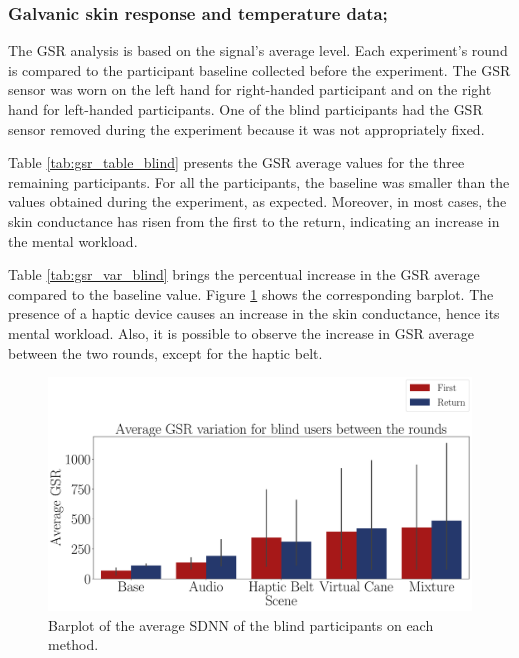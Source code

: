 \subsubsection{Galvanic skin response and temperature data;}
\label{subsubsec:results_gsr_temp_1}

The GSR analysis is based on the signal's average level. Each experiment's round is compared to the participant baseline collected before the experiment. The GSR sensor was worn on the left hand for right-handed participant and on the right hand for left-handed participants. One of the blind participants had the GSR sensor removed during the experiment because it was not appropriately fixed.

Table \ref{tab:gsr_table_blind} presents the GSR average values for the three remaining participants. For all the participants, the baseline was smaller than the values obtained during the experiment, as expected. Moreover, in most cases, the skin conductance has risen from the first to the return, indicating an increase in the mental workload.



Table \ref{tab:gsr_var_blind} brings the percentual increase in the GSR average compared to the baseline value. Figure \ref{fig:barplot_gsr_avg_5_scene_blind} shows the corresponding barplot. The presence of a haptic device causes an increase in the skin conductance, hence its mental workload. Also, it is possible to observe the increase in GSR average between the two rounds, except for the haptic belt.



\begin{figure}[!htb]
    \centering
    \includegraphics[width = \textwidth]{Resultados/GSR/Figuras/pdf/barplot_gsr_avg_5_scene_blind.pdf}
    \caption{Barplot of the average SDNN of the blind participants on each method.}
    \label{fig:barplot_gsr_avg_5_scene_blind}
\end{figure}

